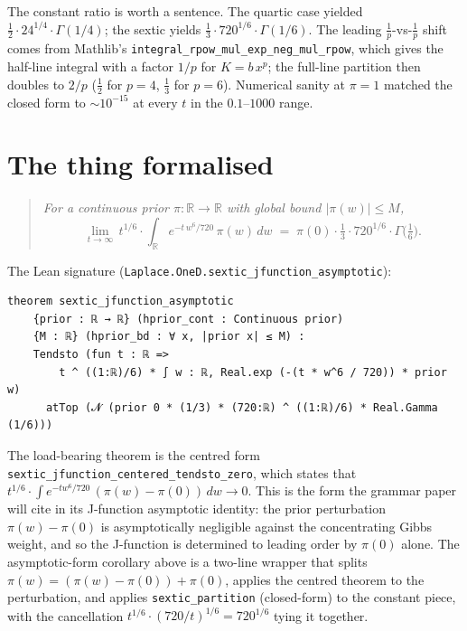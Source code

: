 \documentclass[11pt]{article}
\begin{document}
The constant ratio is worth a sentence. The quartic case yielded
$\tfrac12\cdot 24^{1/4}\cdot \Gamma(1/4)$; the sextic yields
$\tfrac13\cdot 720^{1/6}\cdot \Gamma(1/6)$. The leading
$\tfrac1p$-vs-$\tfrac1{p}$ shift comes from Mathlib's
\texttt{integral\_rpow\_mul\_exp\_neg\_mul\_rpow}, which gives the
half-line integral with a factor $1/p$ for $K = b\, x^p$; the
full-line partition then doubles to $2/p$ ($\tfrac12$ for $p=4$,
$\tfrac13$ for $p=6$). Numerical sanity at $\pi=1$ matched the
closed form to $\sim 10^{-15}$ at every $t$ in the
$0.1$--$1000$ range.

\section{The thing formalised}

\begin{quote}\itshape
For a continuous prior $\pi : \mathbb R \to \mathbb R$ with global
bound $|\pi(w)| \le M$,
\[
  \lim_{t \to \infty}\, t^{1/6} \cdot \int_{\mathbb R} e^{-t\, w^6/720}\,\pi(w)\,dw
    \;=\;
  \pi(0) \cdot \tfrac13 \cdot 720^{1/6} \cdot \Gamma\!\big(\tfrac16\big).
\]
\end{quote}

\noindent The Lean signature
(\texttt{Laplace.OneD.sextic\_jfunction\_asymptotic}):
\begin{verbatim}
theorem sextic_jfunction_asymptotic
    {prior : ℝ → ℝ} (hprior_cont : Continuous prior)
    {M : ℝ} (hprior_bd : ∀ x, |prior x| ≤ M) :
    Tendsto (fun t : ℝ =>
        t ^ ((1:ℝ)/6) * ∫ w : ℝ, Real.exp (-(t * w^6 / 720)) * prior w)
      atTop (𝓝 (prior 0 * (1/3) * (720:ℝ) ^ ((1:ℝ)/6) * Real.Gamma (1/6)))
\end{verbatim}

The load-bearing theorem is the centred form
\texttt{sextic\_jfunction\_centered\_tendsto\_zero}, which states that
$t^{1/6}\cdot \int e^{-tw^6/720}\,(\pi(w)-\pi(0))\,dw \to 0$. This is
the form the grammar paper will cite in its J-function asymptotic
identity: the prior perturbation $\pi(w) - \pi(0)$ is asymptotically
negligible against the concentrating Gibbs weight, and so the
J-function is determined to leading order by $\pi(0)$ alone. The
asymptotic-form corollary above is a two-line wrapper that splits
$\pi(w) = (\pi(w) - \pi(0)) + \pi(0)$, applies the centred theorem to
the perturbation, and applies \texttt{sextic\_partition} (closed-form)
to the constant piece, with the cancellation
$t^{1/6}\cdot (720/t)^{1/6} = 720^{1/6}$ tying it together.
\end{document}
